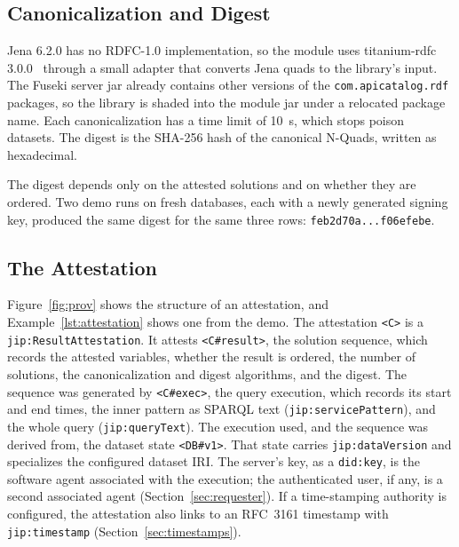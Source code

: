 \documentclass[11pt,a4paper]{article}
\newcommand{\code}[1]{\texttt{#1}}
\begin{document}
\subsection{Canonicalization and Digest}
\label{sec:digest}

Jena 6.2.0 has no RDFC-1.0 implementation, so the module uses titanium-rdfc
3.0.0~\cite{titaniumrdfc} through a small adapter that converts Jena quads to the library's
input. The Fuseki server jar already contains other versions of the
\code{com.apicatalog.rdf} packages, so the library is shaded into the module jar under a
relocated package name. Each canonicalization has a time limit of 10~s, which stops poison
datasets. The digest is the SHA-256 hash of the canonical N-Quads, written as
hexadecimal.

The digest depends only on the attested solutions and on whether they are ordered. Two demo
runs on fresh databases, each with a newly generated signing key, produced the same digest
for the same three rows: \code{feb2d70a...f06efebe}.

\subsection{The Attestation}
\label{sec:attestation}

Figure~\ref{fig:prov} shows the structure of an attestation, and
Example~\ref{lst:attestation} shows one from the demo. The attestation \code{<C>} is a
\code{jip:ResultAttestation}. It attests \code{<C\#result>}, the solution sequence, which
records the attested variables, whether the result is ordered, the number of solutions, the
canonicalization and digest algorithms, and the digest. The sequence was generated by
\code{<C\#exec>}, the query execution, which records its start and end times, the inner
pattern as SPARQL text (\code{jip:servicePattern}), and the whole query
(\code{jip:queryText}). The execution used, and the sequence was derived from, the dataset
state \code{<DB\#v1>}. That state carries \code{jip:dataVersion} and specializes the
configured dataset IRI. The server's key, as a \code{did:key}, is the software agent associated
with the execution; the authenticated user, if any, is a second associated agent
(Section~\ref{sec:requester}). If a time-stamping authority is configured, the attestation
also links to an RFC~3161 timestamp with \code{jip:timestamp} (Section~\ref{sec:timestamps}).
\end{document}
